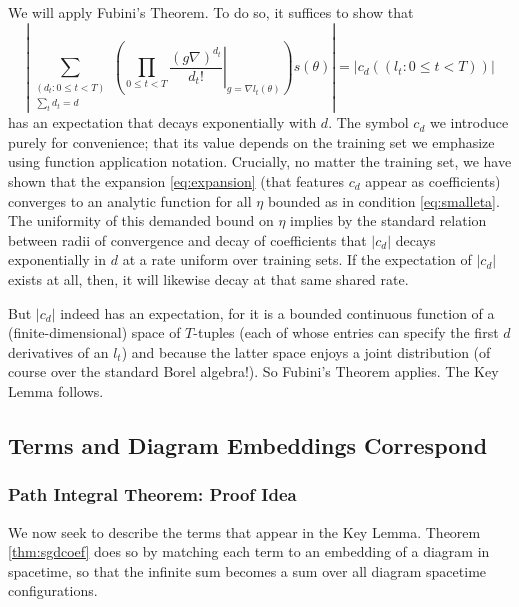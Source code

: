 \documentclass{article}
\newcommand{\wrap}[1]{\left(#1\right)}
\newcommand{\wabs}[1]{\left|#1\right|}
\begin{document}
            We will apply Fubini's Theorem.  To do so, it suffices to show that   
            $$
                \wabs{
                    \sum_{\substack{(d_t: 0\leq t<T) \\ \sum_t d_t = d}}
                    \wrap{
                        \prod_{0 \leq t < T} \left.
                            \frac{(g \nabla)^{d_t}}{d_t!}
                        \right|_{g=\nabla l_t(\theta)}
                    } s (\theta)
                }
                = \wabs{c_d((l_t: 0\leq t<T))} 
            $$
            has an expectation that decays exponentially with $d$.  The symbol
            $c_d$ we introduce purely for convenience; that its value depends
            on the training set we emphasize using function application
            notation.  Crucially, no matter the training set, we have shown
            that the expansion \ref{eq:expansion} (that features $c_d$ appear
            as coefficients) converges to an analytic function for all $\eta$
            bounded as in condition \ref{eq:smalleta}.  The uniformity of this
            demanded bound on $\eta$ implies by the standard relation between
            radii of convergence and decay of coefficients that $\wabs{c_d}$
            decays exponentially in $d$ at a rate uniform over training sets.
            If the expectation of $\wabs{c_d}$ exists at all, then, it will
            likewise decay at that same shared rate.
            
            But $\wabs{c_d}$ indeed has an expectation, for it is a bounded
            continuous function of a (finite-dimensional) space of $T$-tuples
            (each of whose entries can specify the first $d$ derivatives of an
            $l_t$) and because the latter space enjoys a joint distribution (of
            course over the standard Borel algebra!).  So Fubini's Theorem
            applies. The Key Lemma
            follows.   

    \subsection*{Terms and Diagram Embeddings Correspond}
        \subsubsection*{Path Integral Theorem: Proof Idea}
            We now seek to describe the terms that appear in the Key Lemma. 
            Theorem \ref{thm:sgdcoef} does so by matching each term to an
            embedding of a diagram in spacetime, so that the infinite sum
            becomes a sum over all diagram spacetime configurations.
\end{document}

